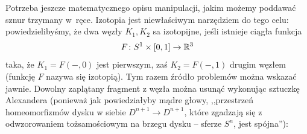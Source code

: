 Potrzeba jeszcze matematycznego opisu manipulacji, jakim możemy poddawać sznur trzymany w~ręce.
Izotopia jest niewłaściwym narzędziem do tego celu: powiedzielibyśmy, że dwa węzły $K_1, K_2$ sa izotopijne, jeśli istnieje ciągła funkcja
\begin{equation}
    F \colon S^1 \times [0, 1] \to \mathbb R^3
\end{equation}
taka, że $K_1 = F(-, 0)$ jest pierwszym, zaś $K_2 = F(-,1)$ drugim węzłem (funkcję $F$ nazywa się izotopią).
Tym razem źródło problemów można wskazać jawnie.
Dowolny zaplątany fragment z węzła można usunąć wykonując sztuczkę Alexandera (ponieważ jak powiedziałyby mądre głowy, ,,przestrzeń homeomorfizmów dysku w siebie $D^{n+1} \to D^{n+1}$, które zgadzają się z odwzorowaniem tożsamościowym na brzegu dysku -- sferze $S^n$, jest spójna''):
%
%

